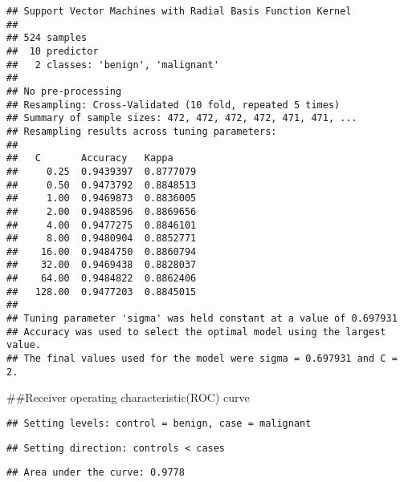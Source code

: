 \documentclass[]{article}
\newenvironment{Shaded}{\begin{snugshade}}{\end{snugshade}}
\newcommand{\DataTypeTok}[1]{\textcolor[rgb]{0.13,0.29,0.53}{#1}}
\newcommand{\KeywordTok}[1]{\textcolor[rgb]{0.13,0.29,0.53}{\textbf{#1}}}
\newcommand{\NormalTok}[1]{#1}
\newcommand{\OperatorTok}[1]{\textcolor[rgb]{0.81,0.36,0.00}{\textbf{#1}}}
\begin{document}
\begin{verbatim}
## Support Vector Machines with Radial Basis Function Kernel 
## 
## 524 samples
##  10 predictor
##   2 classes: 'benign', 'malignant' 
## 
## No pre-processing
## Resampling: Cross-Validated (10 fold, repeated 5 times) 
## Summary of sample sizes: 472, 472, 472, 472, 471, 471, ... 
## Resampling results across tuning parameters:
## 
##   C       Accuracy   Kappa    
##     0.25  0.9439397  0.8777079
##     0.50  0.9473792  0.8848513
##     1.00  0.9469873  0.8836005
##     2.00  0.9488596  0.8869656
##     4.00  0.9477275  0.8846101
##     8.00  0.9480904  0.8852771
##    16.00  0.9484750  0.8860794
##    32.00  0.9469438  0.8828037
##    64.00  0.9484822  0.8862406
##   128.00  0.9477203  0.8845015
## 
## Tuning parameter 'sigma' was held constant at a value of 0.697931
## Accuracy was used to select the optimal model using the largest value.
## The final values used for the model were sigma = 0.697931 and C = 2.
\end{verbatim}

\#\#Receiver operating characteristic(ROC) curve

\begin{Shaded}
\end{Shaded}

\begin{verbatim}
## Setting levels: control = benign, case = malignant
\end{verbatim}

\begin{verbatim}
## Setting direction: controls < cases
\end{verbatim}

\begin{verbatim}
## Area under the curve: 0.9778
\end{verbatim}
\end{document}

